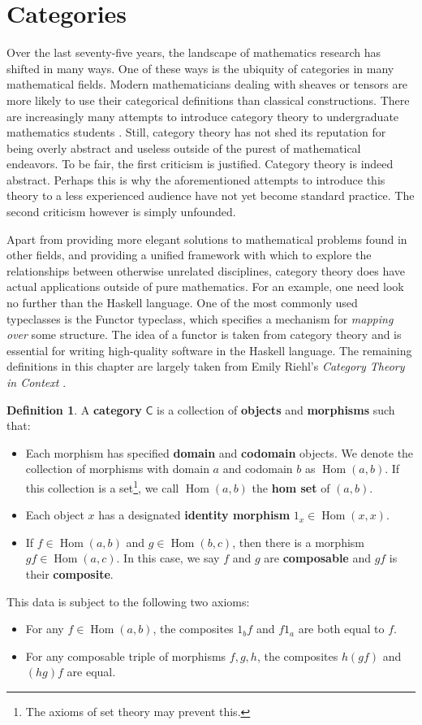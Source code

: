 \documentclass[MS, xcolor=dvipsnames]{wfuthesis}
\def\sC{\mathsf{C}}
\DeclareMathOperator{\Hom}{Hom}
\theoremstyle{definition}
\newtheorem{definition}[theorem]{Definition}
\begin{document}
\section{Categories}
Over the last seventy-five years, the landscape of mathematics research has shifted in many ways. One of these ways is the ubiquity of categories in many mathematical fields. Modern mathematicians dealing with sheaves or tensors are more likely to use their categorical definitions than classical constructions. There are increasingly many attempts to introduce category theory to undergraduate mathematics students \cite{Aluffi2009}. Still, category theory has not shed its reputation for being overly abstract and useless outside of the purest of mathematical endeavors. To be fair, the first criticism is justified. Category theory is indeed abstract. Perhaps this is why the aforementioned attempts to introduce this theory to a less experienced audience have not yet become standard practice. The second criticism however is simply unfounded. \par 
Apart from providing more elegant solutions to mathematical problems found in other fields, and providing a unified framework with which to explore the relationships between otherwise unrelated disciplines, category theory does have actual applications outside of pure mathematics. For an example, one need look no further than the Haskell language. One of the most commonly used typeclasses is the Functor typeclass, which specifies a mechanism for \emph{mapping over} some structure. The idea of a functor is taken from category theory and is essential for writing high-quality software in the Haskell language. The remaining definitions in this chapter are largely taken from Emily Riehl's \textit{Category Theory in Context} \cite{Riehl2016}.
\begin{definition}
  A \textbf{category} $\sC$ is a collection of \textbf{objects} and \textbf{morphisms} such that: 
  \begin{itemize}
    \item Each morphism has specified \textbf{domain} and \textbf{codomain} objects. We denote the collection of morphisms with domain $a$ and codomain $b$ as $\Hom(a,b)$. If this collection is a set\footnote{The axioms of set theory may prevent this.}, we call $\Hom(a,b)$ the \textbf{hom set} of $(a,b)$. 
    \item Each object $x$ has a designated \textbf{identity morphism} $1_x \in \Hom(x,x)$. 
    \item If $f \in \Hom(a,b)$ and $g \in \Hom(b,c)$, then there is a morphism $gf \in \Hom(a,c)$. In this case, we say $f$ and $g$ are \textbf{composable} and $gf$ is their \textbf{composite}. 
  \end{itemize}
  This data is subject to the following two axioms: 
  \begin{itemize}
    \item For any $f \in \Hom(a,b)$, the composites $1_bf$ and $f1_a$ are both equal to $f$. 
    \item For any composable triple of morphisms $f,g,h$, the composites $h(gf)$ and $(hg)f$ are equal.
  \end{itemize}
\end{definition}
\end{document}

